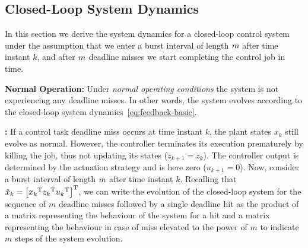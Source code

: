 \subsection{Closed-Loop System Dynamics}%
\label{sec:derivation}
In this section we derive the system dynamics for a closed-loop control system under the assumption that we enter a burst interval of length $m$ after time instant $k$, and after $m$ deadline misses we start completing the control job in time.

\textbf{Normal Operation: }%
Under \emph{normal operating conditions} the system is not experiencing any deadline misses.
In other words, the system evolves according to the closed-loop system dynamics~\eqref{eq:feedback-basic}.

\textbf{\tKZ{}: }%
%
If a control task deadline miss occurs at time instant $k$, the plant states $x_k$ still evolve as normal.
However, the controller terminates its execution prematurely by killing the job, thus not updating its states ($z_{k+1} = z_k$).
The controller output is determined by the actuation strategy and is here zero ($u_{k+1} = 0$).
Now, consider a burst interval of length $m$ after time instant $k$.
Recalling that $\tilde{x}_k = \left[ {x_k}^{\mathrm{\small{T}}} {z_k}^{\mathrm{\small{T}}} {u_k}^{\mathrm{\small{T}}} \right]^{\mathrm{\small{T}}}$, we can write the evolution of the closed-loop system for the sequence of $m$ deadline misses followed by a single deadline hit as the product of a matrix representing the behaviour of the system for a hit and a matrix representing the behaviour in case of miss elevated to the power of $m$ to indicate $m$ steps of the system evolution.


